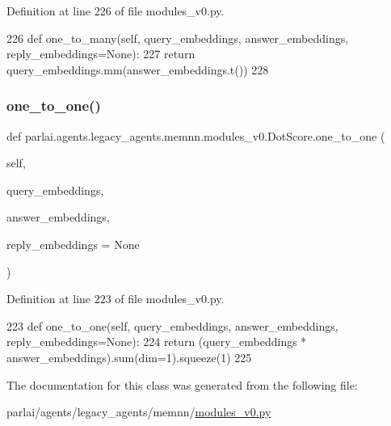 Definition at line 226 of file modules\+\_\+v0.\+py.


\begin{DoxyCode}
226     \textcolor{keyword}{def }one\_to\_many(self, query\_embeddings, answer\_embeddings, reply\_embeddings=None):
227         \textcolor{keywordflow}{return} query\_embeddings.mm(answer\_embeddings.t())
228 \end{DoxyCode}
\mbox{\label{classparlai_1_1agents_1_1legacy__agents_1_1memnn_1_1modules__v0_1_1DotScore_acf84cd9ea66c02103aae3b3ddb78c59e}} 
\subsubsection{\texorpdfstring{one\+\_\+to\+\_\+one()}{one\_to\_one()}}
{\footnotesize\ttfamily def parlai.\+agents.\+legacy\+\_\+agents.\+memnn.\+modules\+\_\+v0.\+Dot\+Score.\+one\+\_\+to\+\_\+one (\begin{DoxyParamCaption}\item[{}]{self,  }\item[{}]{query\+\_\+embeddings,  }\item[{}]{answer\+\_\+embeddings,  }\item[{}]{reply\+\_\+embeddings = {\ttfamily None} }\end{DoxyParamCaption})}



Definition at line 223 of file modules\+\_\+v0.\+py.


\begin{DoxyCode}
223     \textcolor{keyword}{def }one\_to\_one(self, query\_embeddings, answer\_embeddings, reply\_embeddings=None):
224         \textcolor{keywordflow}{return} (query\_embeddings * answer\_embeddings).sum(dim=1).squeeze(1)
225 
\end{DoxyCode}


The documentation for this class was generated from the following file\+:\begin{DoxyCompactItemize}
\item 
parlai/agents/legacy\+\_\+agents/memnn/\hyperlink{memnn_2modules__v0_8py}{modules\+\_\+v0.\+py}\end{DoxyCompactItemize}
